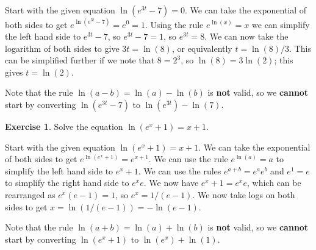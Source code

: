 \documentclass[a4paper]{amsart}
\theoremstyle{definition}
\newtheorem{exercise}{Exercise}[section]
\newenvironment{solution}{{\noindent \bf Solution:}}{}
\begin{document}
\begin{solution}
 Start with the given equation $\ln(e^{3t}-7)=0$.  We can take the
 exponential of both sides to get $e^{\ln(e^{3t}-7)}=e^0=1$.  Using
 the rule $e^{\ln(x)}=x$ we can simplify the left hand side to
 $e^{3t}-7$, so $e^{3t}-7=1$, so $e^{3t}=8$.  We can now take the
 logarithm of both sides to give $3t=\ln(8)$, or equivalently
 $t=\ln(8)/3$.  This can be simplified further if we note that
 $8=2^3$, so $\ln(8)=3\ln(2)$; this gives $t=\ln(2)$.

 Note that the rule $\ln(a-b)=\ln(a)-\ln(b)$ is \textbf{not} valid, so
 we \textbf{cannot} start by converting $\ln(e^{3t}-7)$ to
 $\ln(e^{3t})-\ln(7)$. 
\end{solution}

\begin{exercise}\label{ex-log-shift}
Solve the equation $\ln(e^x+1)=x+1$.
\end{exercise}
\begin{solution}
 Start with the given equation $\ln(e^x+1)=x+1$.  We can take the
 exponential of both sides to get $e^{\ln(e^x+1)}=e^{x+1}$.  We can
 use the rule $e^{\ln(a)}=a$ to simplify the left hand side to
 $e^x+1$.  We can use the rules $e^{a+b}=e^ae^b$ and $e^1=e$ to
 simplify the right hand side to $e^xe$.  We now have $e^x+1=e^xe$,
 which can be rearranged as $e^x(e-1)=1$, so $e^x=1/(e-1)$.  We now
 take logs on both sides to get $x=\ln(1/(e-1))=-\ln(e-1)$.

 Note that the rule $\ln(a+b)=\ln(a)+\ln(b)$ is \textbf{not} valid, so
 we \textbf{cannot} start by converting $\ln(e^x+1)$ to
 $\ln(e^x)+\ln(1)$. 
\end{solution}
\end{document}
